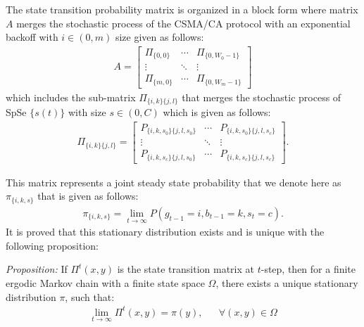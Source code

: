 \documentclass
[journal,11pt,draftclsnofoot,onecolumn,doublespace]{tETN2e}
\begin{document}
The state transition probability matrix is organized in a block form where matrix $A$ merges the stochastic process of the CSMA/CA protocol with an exponential backoff with $i\in(0,m)$ size given as follows:
\begin{eqnarray} \label{eq5}
 A =  \begin{bmatrix} \Pi_{\lbrace 0,0\rbrace} & \cdots & \Pi_{\lbrace 0,W_0-1\rbrace} \\ \vdots & \ddots & \vdots \\ \Pi_{\lbrace m,0\rbrace} & \cdots & \Pi_{\lbrace 0,W_m-1\rbrace} \end{bmatrix}
\end{eqnarray}
which includes the sub-matrix $\Pi_{\lbrace i,k \rbrace \lbrace j,l \rbrace}$ that merges the stochastic process of SpSe $\lbrace s(t)\rbrace$ with size $s\in(0,C)$ which is given as follows: 
\begin{eqnarray} \label{eq6}
\Pi_{\lbrace i,k \rbrace \lbrace j,l \rbrace} =  \begin{bmatrix} P_{\lbrace i,k,s_0 \rbrace \lbrace j,l,s_0 \rbrace} & \cdots & P_{\lbrace i,k,s_0 \rbrace \lbrace j,l,s_c \rbrace} \\ \vdots & \ddots & \vdots \\ P_{\lbrace i,k,s_c \rbrace \lbrace j,l,s_0 \rbrace} & \cdots & P_{\lbrace i,k,s_c \rbrace \lbrace j,l,s_c \rbrace} \end{bmatrix} .
\end{eqnarray}

This matrix represents a joint steady state probability that we denote here as $\pi_{\lbrace i,k,s \rbrace}$ that is given as follows: 
\begin{eqnarray} \label{eq7}
 \pi_{\lbrace i,k,s \rbrace} = \lim\limits_{t \rightarrow \infty} P(g_{t-1}=i,b_{t-1}=k,s_t=c) . 
\end{eqnarray}
It is proved that this stationary distribution exists and is unique with the following proposition:

\textit{Proposition:} If $\Pi^t(x,y)$ is the state transition matrix at $t$-step, then for a finite ergodic Markov chain with a finite state space $\Omega$, there exists a unique stationary distribution $\pi$, such that:
\begin{eqnarray} \label{eq8}
\lim_{t \rightarrow \infty} \Pi^t(x,y) = \pi(y), & & \forall (x,y) \in \Omega
\end{eqnarray}
\end{document}
